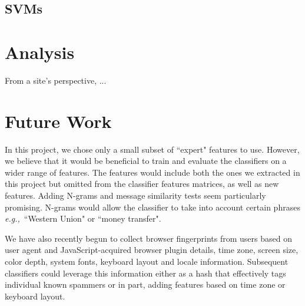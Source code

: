 \documentclass[preprint]{acm_proc_article-sp}
\newcommand{\eg}{{\em e.g.,}~}
\begin{document}
\subsection{SVMs}

%
%

\section{Analysis}
From a site's perspective, ...

\section{Future Work}

In this project, we chose only a small subset of ``expert" features to use. However, we believe that it would be beneficial to train and evaluate the classifiers on a wider range of features. The features would include both the ones we extracted in this project but omitted from the classifier features matrices, as well as new features. Adding N-grams and message similarity tests seem particularly promising. N-grams would allow the classifier to take into account certain phrases \eg{``Western Union" or ``money transfer"}. 

We have also recently begun to collect browser fingerprints from users based on user agent and JavaScript-acquired browser plugin details, time zone, screen size, color depth, system fonts, keyboard layout and locale information. Subsequent classifiers could leverage this information either as a hash that effectively tags individual known spammers or in part, adding features based on time zone or keyboard layout.
\end{document}
